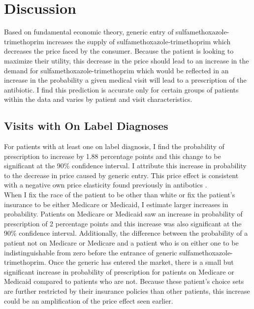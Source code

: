\chapter{Discussion}
Based on fundamental economic theory, generic entry of sulfamethoxazole-trimethoprim increases the supply of sulfamethoxazole-trimethoprim which decreases the price faced by the consumer. Because the patient is looking to maximize their utility, this decrease in the price should lead to an increase in the demand for sulfamethoxazole-trimethoprim which would be reflected in an increase in the probability a given medical visit will lead to a prescription of the antibiotic. I find this prediction is accurate only for certain groups of patients within the data and varies by patient and visit characteristics.\\
\section{Visits with On Label Diagnoses}
\indent For patients with at least one on label diagnosis, I find the probability of prescription to increase by 1.88 percentage points and this change to be significant at the 90\% confidence interval. I attribute this increase in probability to the decrease in price caused by generic entry. This price effect is consistent with a negative own price elasticity found previously in antibotics \cite{kaier_impact_2013}.\\
\indent When I fix the race of the patient to be other than white or fix the patient's insurance to be either Medicare or Medicaid, I estimate larger increases in probability. Patients on Medicare or Medicaid saw an increase in probability of prescription of 2 percentage points and this increase was also significant at the 90\% confidence interval. Additionally, the difference between the probability of a patient not on Medicare or Medicare and a patient who is on either one to be indistinguishable from zero before the entrance of generic sulfamethoxazole-trimethoprim. Once the generic has entered the market, there is a small but significant increase in probability of prescription for patients on Medicare or Medicaid compared to patients who are not. Because these patient's choice sets are further restricted by their insurance policies than other patients, this increase could be an amplification of the price effect seen earlier.\\
